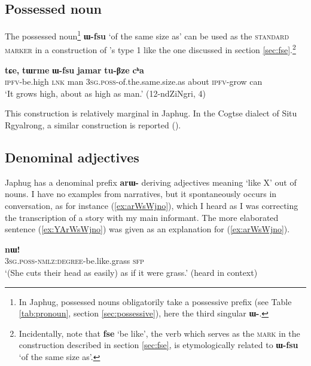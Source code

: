 \documentclass[oneside,a4paper,11pt]{article}
\newcommand{\ipa}[1]{{\phon\textbf{#1}}} %
\newcommand{\forme}[2]{\ipa{#1} `#2'}
\begin{document}
\subsection{Possessed noun} \label{sec:Wfsu}
The possessed noun\footnote{In Japhug, possessed nouns obligatorily take a possessive prefix (see Table \ref{tab:pronoun}, section \ref{sec:possessive}), here the third singular \ipa{ɯ-}. } \forme{ɯ-fsu}{of the same size as} can be used as the \textsc{standard marker} in a construction of \citet{haspelmath17equative}'s type 1 like the one discussed in section \ref{sec:fse}.\footnote{Incidentally, note that \forme{fse}{be like}, the verb which serves as the \textsc{mark} in the construction described in section \ref{sec:fse}, is etymologically related to \forme{ɯ-fsu}{of the same size as}.}

\begin{exe}
\ex \label{ex:Wfsu}
\gll \ipa{tu-mbro} 	\ipa{tɕe,} 	\ipa{tɯrme} 	\ipa{ɯ-fsu} 	\ipa{jamar} 	\ipa{tu-βze} 	\ipa{cʰa} \\
\textsc{ipfv}-be.high \textsc{lnk} man \textsc{3sg.poss}-of.the.same.size.as about \textsc{ipfv}-grow can \\
\glt `It grows high, about as high as man.' (12-ndZiNgri, 4)
\end{exe}

This construction is relatively marginal in Japhug. In the Cogtse dialect of Situ Rgyalrong, a similar construction is reported (\citealt[377]{linxr93jiarong}).

\subsection{Denominal adjectives} \label{sec:denominal}
Japhug has a denominal prefix \ipa{arɯ-} deriving adjectives meaning `like X' out of nouns. I have no examples from narratives, but it spontaneously occurs in conversation, as for instance (\ref{ex:arWsWjno}), which I heard as I was correcting the transcription of a story with my main informant. The more elaborated sentence (\ref{ex:YArWsWjno}) was given as an explanation for (\ref{ex:arWsWjno}).

\begin{exe}
\ex \label{ex:arWsWjno}
\gll \ipa{ɯ-tɯ-ɤrɯsɯjno} 	\ipa{nɯ!}  \\
\textsc{3sg.poss-nmlz:degree}-be.like.grass \textsc{sfp} \\
\glt `(She cuts their head as easily) as if it were grass.' (heard in context)
\end{exe}
\end{document}
